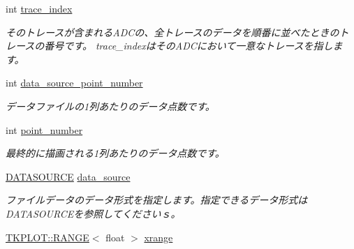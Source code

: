 \begin{DoxyCompactItemize}
int \hyperlink{class_t_k_p_l_o_t_1_1_p_l_o_t_i_n_f_o_a48ef8281322bf15a1e48cca923d34eeb}{trace\+\_\+index}
\begin{DoxyCompactList}\small\item\em そのトレースが含まれる\+A\+D\+Cの、全トレースのデータを順番に並べたときのトレースの番号です。 trace\+\_\+indexはその\+A\+D\+Cにおいて一意なトレースを指します。 \end{DoxyCompactList}\item 
\mbox{\label{class_t_k_p_l_o_t_1_1_p_l_o_t_i_n_f_o_a54f1fba1318e3fdb099900839253777e}} 
int \hyperlink{class_t_k_p_l_o_t_1_1_p_l_o_t_i_n_f_o_a54f1fba1318e3fdb099900839253777e}{data\+\_\+source\+\_\+point\+\_\+number}
\begin{DoxyCompactList}\small\item\em データファイルの1列あたりのデータ点数です。 \end{DoxyCompactList}\item 
\mbox{\label{class_t_k_p_l_o_t_1_1_p_l_o_t_i_n_f_o_acd0e9a0e12d7679f93004dcb6bbaa489}} 
int \hyperlink{class_t_k_p_l_o_t_1_1_p_l_o_t_i_n_f_o_acd0e9a0e12d7679f93004dcb6bbaa489}{point\+\_\+number}
\begin{DoxyCompactList}\small\item\em 最終的に描画される1列あたりのデータ点数です。 \end{DoxyCompactList}\item 
\mbox{\label{class_t_k_p_l_o_t_1_1_p_l_o_t_i_n_f_o_a8f7e0649b327f69db18c9bac7315a4e7}} 
\hyperlink{class_t_k_p_l_o_t_a28dfea1dd78dfc49c1926518da615bfa}{D\+A\+T\+A\+S\+O\+U\+R\+CE} \hyperlink{class_t_k_p_l_o_t_1_1_p_l_o_t_i_n_f_o_a8f7e0649b327f69db18c9bac7315a4e7}{data\+\_\+source}
\begin{DoxyCompactList}\small\item\em ファイルデータのデータ形式を指定します。指定できるデータ形式は D\+A\+T\+A\+S\+O\+U\+R\+C\+Eを参照してくださいｓ。 \end{DoxyCompactList}\item 
\mbox{\label{class_t_k_p_l_o_t_1_1_p_l_o_t_i_n_f_o_a13b0235f3544b9d875af92ce3ac247ab}} 
\hyperlink{class_t_k_p_l_o_t_1_1_r_a_n_g_e}{T\+K\+P\+L\+O\+T\+::\+R\+A\+N\+GE}$<$ float $>$ \hyperlink{class_t_k_p_l_o_t_1_1_p_l_o_t_i_n_f_o_a13b0235f3544b9d875af92ce3ac247ab}{xrange}

\end{DoxyCompactItemize}
